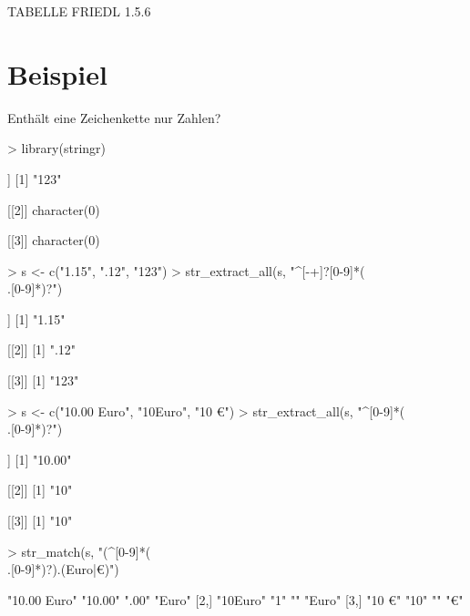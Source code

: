 \documentclass[a4paper]{report}
\begin{document}
TABELLE FRIEDL 1.5.6

\section{Beispiel}

Enthält eine Zeichenkette nur Zahlen?

\begin{Schunk}
\begin{Sinput}
> library(stringr)
\end{Sinput}
\end{Schunk}

\begin{Schunk}
\begin{Soutput}
[[1]]
[1] "123"

[[2]]
character(0)

[[3]]
character(0)
\end{Soutput}
\end{Schunk}

\begin{Schunk}
\begin{Sinput}
> s <- c("1.15", ".12", "123")
> str_extract_all(s, "^[-+]?[0-9]*(\\.[0-9]*)?")
\end{Sinput}
\begin{Soutput}
[[1]]
[1] "1.15"

[[2]]
[1] ".12"

[[3]]
[1] "123"
\end{Soutput}
\end{Schunk}

\begin{Schunk}
\begin{Sinput}
> s <- c("10.00 Euro", "10Euro", "10 €")
> str_extract_all(s, "^[0-9]*(\\.[0-9]*)?")
\end{Sinput}
\begin{Soutput}
[[1]]
[1] "10.00"

[[2]]
[1] "10"

[[3]]
[1] "10"
\end{Soutput}
\begin{Sinput}
> str_match(s, "(^[0-9]*(\\.[0-9]*)?).(Euro|€)")
\end{Sinput}
\begin{Soutput}
     [,1]         [,2]    [,3]  [,4]  
[1,] "10.00 Euro" "10.00" ".00" "Euro"
[2,] "10Euro"     "1"     ""    "Euro"
[3,] "10 €"       "10"    ""    "€"   
\end{Soutput}
\end{Schunk}
\end{document}
